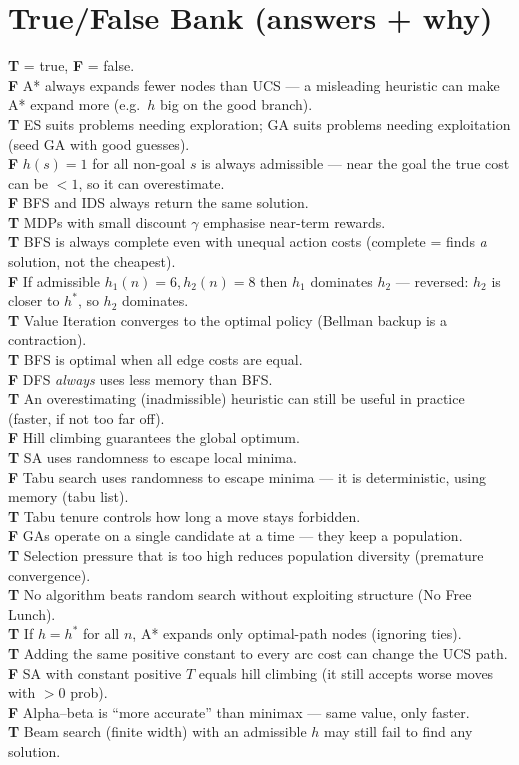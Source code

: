 \section{True/False Bank (answers + why)}
\textbf{T} = true, \textbf{F} = false.\\
\textbf{F} A* always expands fewer nodes than UCS --- a misleading heuristic can make A* expand more (e.g.\ \(h\) big on the good branch).\\
\textbf{T} ES suits problems needing exploration; GA suits problems needing exploitation (seed GA with good guesses).\\
\textbf{F} \(h(s)=1\) for all non-goal \(s\) is always admissible --- near the goal the true cost can be \(<1\), so it can overestimate.\\
\textbf{F} BFS and IDS always return the same solution.\\
\textbf{T} MDPs with small discount \(\gamma\) emphasise near-term rewards.\\
\textbf{T} BFS is always complete even with unequal action costs (complete = finds \emph{a} solution, not the cheapest).\\
\textbf{F} If admissible \(h_1(n){=}6,h_2(n){=}8\) then \(h_1\) dominates \(h_2\) --- reversed: \(h_2\) is closer to \(h^*\), so \(h_2\) dominates.\\
\textbf{T} Value Iteration converges to the optimal policy (Bellman backup is a contraction).\\
\textbf{T} BFS is optimal when all edge costs are equal.\\
\textbf{F} DFS \emph{always} uses less memory than BFS.\\
\textbf{T} An overestimating (inadmissible) heuristic can still be useful in practice (faster, if not too far off).\\
\textbf{F} Hill climbing guarantees the global optimum.\\
\textbf{T} SA uses randomness to escape local minima.\\
\textbf{F} Tabu search uses randomness to escape minima --- it is deterministic, using memory (tabu list).\\
\textbf{T} Tabu tenure controls how long a move stays forbidden.\\
\textbf{F} GAs operate on a single candidate at a time --- they keep a population.\\
\textbf{T} Selection pressure that is too high reduces population diversity (premature convergence).\\
\textbf{T} No algorithm beats random search without exploiting structure (No Free Lunch).\\
\textbf{T} If \(h=h^*\) for all \(n\), A* expands only optimal-path nodes (ignoring ties).\\
\textbf{T} Adding the same positive constant to every arc cost can change the UCS path.\\
\textbf{F} SA with constant positive \(T\) equals hill climbing (it still accepts worse moves with \(>0\) prob).\\
\textbf{F} Alpha--beta is ``more accurate'' than minimax --- same value, only faster.\\
\textbf{T} Beam search (finite width) with an admissible \(h\) may still fail to find any solution.
